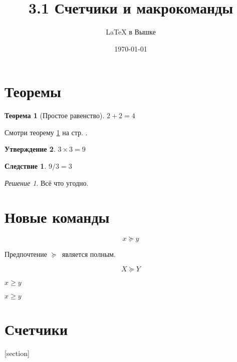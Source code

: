 \documentclass[a4paper,12pt]{article}
\author{\LaTeX{} в Вышке}
\title{3.1 Счетчики и макрокоманды}
\date{\today}
\theoremstyle{plain} %
\newtheorem{theorem}{Теорема}[section]
\newtheorem{proposition}[theorem]{Утверждение}
\theoremstyle{definition} %
\newtheorem{corollary}{Следствие}[theorem]
\theoremstyle{remark} %
\newtheorem*{nonum}{Решение}
\begin{document}

\maketitle

\section{Теоремы}

\begin{theorem}[Простое равенство]\label{theorem1}
	$2+2=4$
\end{theorem}

Смотри теорему \ref{theorem1} на стр. \pageref{theorem1}.

\begin{proposition}
	$3\times 3 = 9$
\end{proposition}

\begin{corollary}
	$9/3 = 3$
\end{corollary}

\begin{nonum}
	Всё что угодно.
\end{nonum}

\section{Новые команды}

\newcommand{\nw}{\ensuremath{\succcurlyeq}}

\begin{equation}\label{pref}
	x \nw y 
\end{equation}

Предпочтение \nw\ является полным.

\newcommand{\str}[1]{%
на стр. \pageref{#1}%
}

\newcommand{\qwerty}[2][X]{
\begin{equation}
	#1 \nw #2
\end{equation}
}

\qwerty{Y}

$x\ge y$

\renewcommand{\ge}{\geqslant}

$x\ge y$

\section{Счетчики}

[section]
\end{document}
